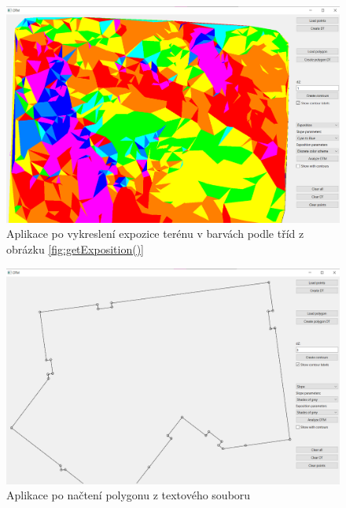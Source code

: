 \documentclass[11pt]{article}
\begin{document}
\begin{figure}[htbh]
	\centering
	\captionsetup{justification=centering}
	\includegraphics[scale=0.35]{images/vystup_AnalyzeDTM_exposition_discrete.png} 
	\caption{Aplikace po vykreslení expozice terénu v barvách podle tříd z obrázku \ref{fig:getExposition()}}	\label{fig:vystup_AnalyzeDTM_exposition_discrete}
\end{figure} 
\begin{figure}[htbh]
	\centering
	\captionsetup{justification=centering}
	\includegraphics[scale=0.35]{images/vystup_LoadPolygon.png} 
	\caption{Aplikace po načtení polygonu z textového souboru}	\label{fig:vystup_LoadPolygon}
\end{figure} 
\end{document}
